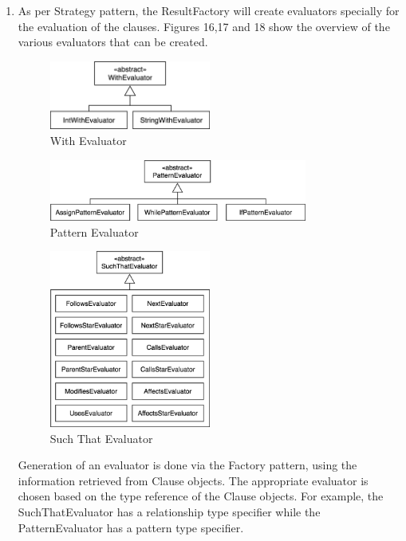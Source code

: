\documentclass[12pt]{article}
\begin{document}
{{{{{{{{{{\begin{enumerate}
\item As per Strategy pattern, the ResultFactory will create evaluators specially for the evaluation of the clauses. Figures 16,17 and 18 show the overview of the various evaluators that can be created. 
   \begin{center}
\begin{figure}[!htbp]
  \caption{With Evaluator}
 \includegraphics[width=0.5\textwidth]{WithEvaluator.png}
\end{figure}
\end{center}
\begin{figure}[!htbp]
  \centering 
  \caption{Pattern Evaluator}
 \includegraphics[width=0.8\textwidth]{PatternEvaluator.png}
\end{figure}
\begin{figure}[!htbp]
  \centering 
  \caption{Such That Evaluator}
 \includegraphics[width=0.5\textwidth]{SuchThatEvaluator.png}
\end{figure}
Generation of an evaluator is done via the Factory pattern, using the information retrieved from Clause objects. The appropriate evaluator is chosen based on the type reference of the Clause objects. For example, the SuchThatEvaluator has a relationship type specifier while the PatternEvaluator has a pattern type specifier.

\end{enumerate}}}}}}}}}}}
\end{document}
